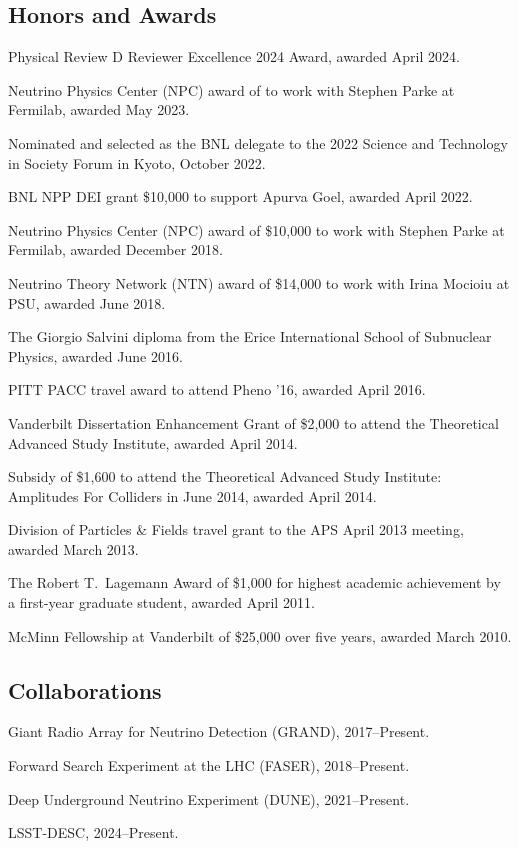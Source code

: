 \documentclass{article}
\renewenvironment{itemize}{
\begin{list}{}{
\setlength{\leftmargin}{.5em}}}{
\end{list}}
\begin{document}
\subsection*{Honors and Awards}
\begin{itemize}
\item Physical Review D Reviewer Excellence 2024 Award, awarded April 2024.
\item Neutrino Physics Center (NPC) award of to work with Stephen Parke at Fermilab, awarded May 2023.
\item Nominated and selected as the BNL delegate to the 2022 Science and Technology in Society Forum in Kyoto, October 2022.
\item BNL NPP DEI grant \$10,000 to support Apurva Goel, awarded April 2022.
\item Neutrino Physics Center (NPC) award of \$10,000 to work with Stephen Parke at Fermilab, awarded December 2018.
\item Neutrino Theory Network (NTN) award of \$14,000 to work with Irina Mocioiu at PSU, awarded June 2018.
\item The Giorgio Salvini diploma from the Erice International School of Subnuclear Physics, awarded June 2016.
\item PITT PACC travel award to attend Pheno '16, awarded April 2016.
\item Vanderbilt Dissertation Enhancement Grant of \$2,000 to attend the Theoretical Advanced Study Institute, awarded April 2014.
\item Subsidy of \$1,600 to attend the Theoretical Advanced Study Institute: Amplitudes For Colliders in June 2014, awarded April 2014.
\item Division of Particles \& Fields travel grant to the APS April 2013 meeting, awarded March 2013.
\item The Robert T.~Lagemann Award of \$1,000 for highest academic achievement by a first-year graduate student, awarded April 2011.
\item McMinn Fellowship at Vanderbilt of \$25,000 over five years, awarded March 2010.
\end{itemize}

\subsection*{Collaborations}
\begin{itemize}
\item Giant Radio Array for Neutrino Detection (GRAND), 2017--Present.
\item Forward Search Experiment at the LHC (FASER), 2018--Present.
\item Deep Underground Neutrino Experiment (DUNE), 2021--Present.
\item LSST-DESC, 2024--Present.
\end{itemize}
\end{document}

